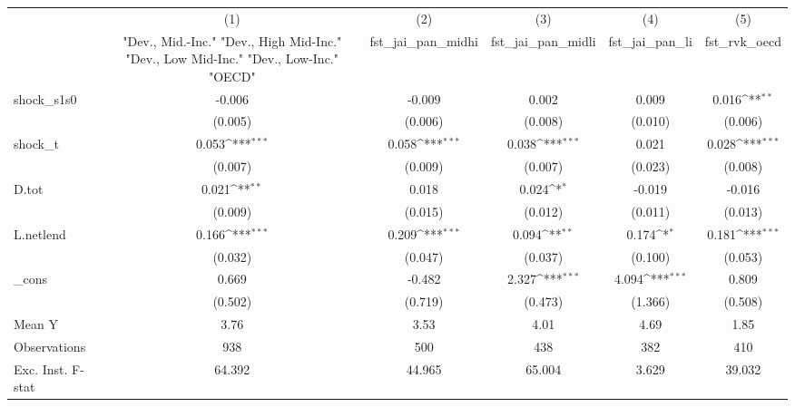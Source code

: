 {
\def\sym#1{\ifmmode^{#1}\else\(^{#1}\)\fi}
\begin{tabular}{l*{5}{c}}
\toprule
            &\multicolumn{1}{c}{(1)}&\multicolumn{1}{c}{(2)}&\multicolumn{1}{c}{(3)}&\multicolumn{1}{c}{(4)}&\multicolumn{1}{c}{(5)}\\
            &\multicolumn{1}{c}{ "Dev., Mid.-Inc." "Dev., High Mid-Inc." "Dev., Low Mid-Inc." "Dev., Low-Inc." "OECD" }&\multicolumn{1}{c}{fst\_jai\_pan\_midhi}&\multicolumn{1}{c}{fst\_jai\_pan\_midli}&\multicolumn{1}{c}{fst\_jai\_pan\_li}&\multicolumn{1}{c}{fst\_rvk\_oecd}\\
\midrule
shock\_s1s0  &      -0.006         &      -0.009         &       0.002         &       0.009         &       0.016\sym{**} \\
            &     (0.005)         &     (0.006)         &     (0.008)         &     (0.010)         &     (0.006)         \\
\addlinespace
shock\_t     &       0.053\sym{***}&       0.058\sym{***}&       0.038\sym{***}&       0.021         &       0.028\sym{***}\\
            &     (0.007)         &     (0.009)         &     (0.007)         &     (0.023)         &     (0.008)         \\
\addlinespace
D.tot       &       0.021\sym{**} &       0.018         &       0.024\sym{*}  &      -0.019         &      -0.016         \\
            &     (0.009)         &     (0.015)         &     (0.012)         &     (0.011)         &     (0.013)         \\
\addlinespace
L.netlend   &       0.166\sym{***}&       0.209\sym{***}&       0.094\sym{**} &       0.174\sym{*}  &       0.181\sym{***}\\
            &     (0.032)         &     (0.047)         &     (0.037)         &     (0.100)         &     (0.053)         \\
\addlinespace
\_cons      &       0.669         &      -0.482         &       2.327\sym{***}&       4.094\sym{***}&       0.809         \\
            &     (0.502)         &     (0.719)         &     (0.473)         &     (1.366)         &     (0.508)         \\
\midrule
Mean Y      &        3.76         &        3.53         &        4.01         &        4.69         &        1.85         \\
Observations&         938         &         500         &         438         &         382         &         410         \\
Exc. Inst. F-stat&      64.392         &      44.965         &      65.004         &       3.629         &      39.032         \\
\bottomrule
\end{tabular}
}
